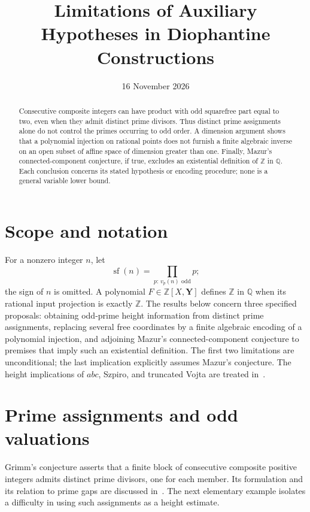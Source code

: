 \documentclass[11pt,a4paper]{article}
\title{Limitations of Auxiliary Hypotheses in Diophantine Constructions}
\author{}\date{16 November 2026}
\theoremstyle{definition}\newtheorem{definition}[theorem]{Definition}
\theoremstyle{remark}\newtheorem{remark}[theorem]{Remark}
\newcommand{\Q}{\mathbb Q}\newcommand{\Z}{\mathbb Z}
\DeclareMathOperator{\sfpart}{sf}
\begin{document}
\maketitle
\begin{abstract}
Consecutive composite integers can have product with odd squarefree
part equal to two, even when they admit distinct prime divisors.
Thus distinct prime assignments alone do not control the primes
occurring to odd order. A dimension argument shows that a polynomial
injection on rational points does not furnish a finite algebraic
inverse on an open subset of affine space of dimension greater than
one. Finally, Mazur's connected-component conjecture, if true, excludes
an existential definition of $\Z$ in $\Q$. Each conclusion concerns
its stated hypothesis or encoding procedure; none is a general
variable lower bound.
\end{abstract}

\section{Scope and notation}
For a nonzero integer $n$, let
\[
                 \sfpart(n)=\prod_{p:\,v_p(n)\text{ odd}}p;
\]
the sign of $n$ is omitted. A polynomial $F\in\Z[X,\mathbf Y]$
defines $\Z$ in $\Q$ when its rational input projection is exactly
$\Z$. The results below concern three specified proposals: obtaining
odd-prime height information from distinct prime assignments, replacing
several free coordinates by a finite algebraic encoding of a polynomial
injection, and adjoining Mazur's connected-component conjecture to
premises that imply such an existential definition. The first two
limitations are unconditional; the last implication explicitly assumes
Mazur's conjecture. The height implications of $abc$, Szpiro, and
truncated Vojta are treated in~\cite{HeightHypotheses}.

\section{Prime assignments and odd valuations}

Grimm's conjecture asserts that a finite block of consecutive
composite positive integers admits distinct prime divisors,
one for each member. Its formulation and its relation to prime
gaps are discussed in~\cite{ErdosPomerance}.
The next elementary example isolates a difficulty in using
such assignments as a height estimate.
\end{document}
